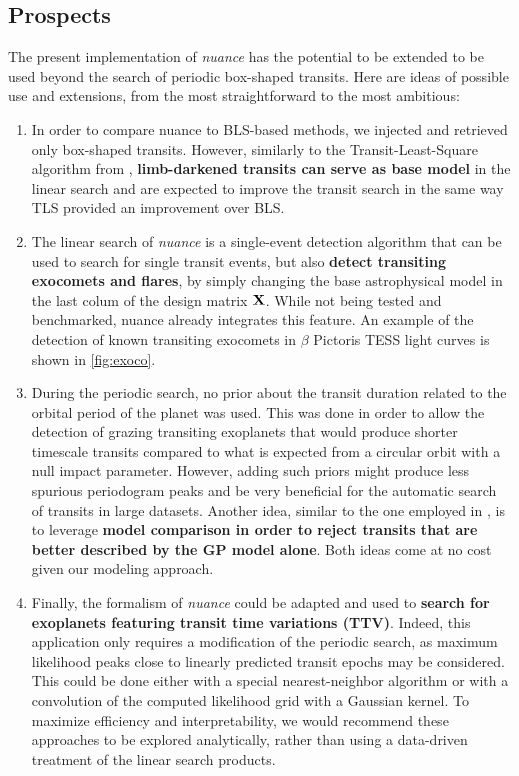 \documentclass[modern]{aastex631}
\newcommand{\nuancemethod}{\textit{nuance}}
\newcommand{\nuancecode}{\textsf{nuance}}
\begin{document}
\subsection{Prospects}
The present implementation of \nuancemethod{} has the potential to be extended to be used beyond the search of periodic box-shaped transits. Here are ideas of possible use and extensions, from the most straightforward to the most ambitious:
\begin{enumerate}
    \item In order to compare \nuancecode{} to BLS-based methods, we injected and retrieved only box-shaped transits. However, similarly to the Transit-Least-Square algorithm from \cite{tls}, \textbf{limb-darkened transits can serve as base model} in the linear search and are expected to improve the transit search in the same way TLS provided an improvement over BLS.
    \item The linear search of \nuancemethod{} is a single-event detection algorithm that can be used to search for single transit events, but also \textbf{detect transiting exocomets and flares}, by simply changing the base astrophysical model in the last colum of the design matrix $\bf{X}$. While not being tested and benchmarked, \nuancecode{} already integrates this feature. An example of the detection of known transiting exocomets in $\beta$ Pictoris TESS light curves is shown in \autoref{fig:exoco}.
    \item During the periodic search, no prior about the transit duration related to the orbital period of the planet was used. This was done in order to allow the detection of grazing transiting exoplanets that would produce shorter timescale transits compared to what is expected from a circular orbit with a null impact parameter. However, adding such priors might produce less spurious periodogram peaks and be very beneficial for the automatic search of transits in large datasets. Another idea, similar to the one employed in \cite{foreman2016}, is to leverage \textbf{model comparison in order to reject transits that are better described by the GP model alone}. Both ideas come at no cost given our modeling approach.
    \item Finally, the formalism of \nuancemethod{} could be adapted and used to \textbf{search for exoplanets featuring transit time variations (TTV)}. Indeed, this application only requires a modification of the periodic search, as maximum likelihood peaks close to linearly predicted transit epochs may be considered. This could be done either with a special nearest-neighbor algorithm or with a convolution of the computed likelihood grid with a Gaussian kernel. To maximize efficiency and interpretability, we would recommend these approaches to be explored analytically, rather than using a data-driven treatment of the linear search products.
\end{enumerate}
\end{document}
